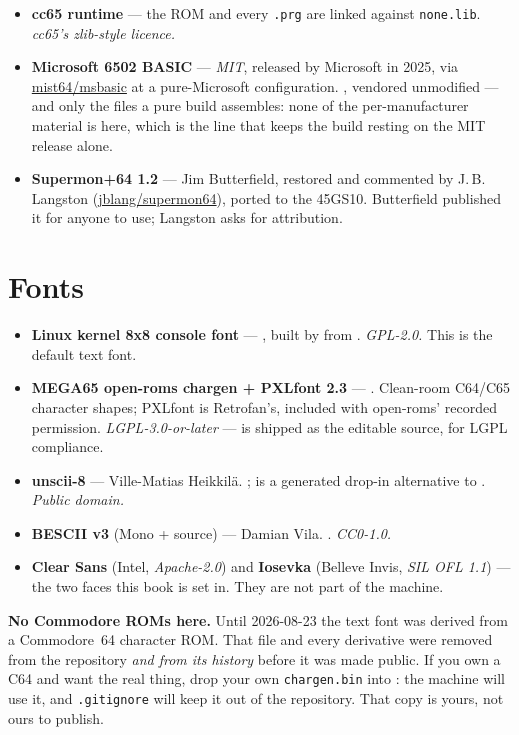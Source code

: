 \begin{itemize}[leftmargin=1.4em]
  licence.
\item \textbf{cc65 runtime} --- the ROM and every \verb|.prg| are
  linked against \verb|none.lib|. \emph{cc65's zlib-style licence.}
\item \textbf{Microsoft 6502 BASIC} --- \emph{MIT}, released by
  Microsoft in 2025, via \href{https://github.com/mist64/msbasic}{mist64/msbasic}
  at a pure-Microsoft configuration. , vendored
  unmodified --- and only the files a pure build assembles: none of the
  per-manufacturer material is here, which is the line that keeps the
  build resting on the MIT release alone.
\item \textbf{Supermon+64 1.2} --- Jim Butterfield, restored and
  commented by J.\,B. Langston
  (\href{https://github.com/jblang/supermon64}{jblang/supermon64}),
  ported to the 45GS10. Butterfield published it for anyone to use;
  Langston asks for attribution.
\end{itemize}

\section{Fonts}
\begin{itemize}[leftmargin=1.4em]
\item \textbf{Linux kernel 8x8 console font} --- ,
  built by  from .
  \emph{GPL-2.0.} This is the default text font.
\item \textbf{MEGA65 open-roms chargen + PXLfont 2.3} ---
  . Clean-room C64/C65 character shapes;
  PXLfont is Retrofan's, included with open-roms' recorded permission.
  \emph{LGPL-3.0-or-later} ---  is shipped as the
  editable source, for LGPL compliance.
\item \textbf{unscii-8} --- Ville-Matias Heikkilä.
  ;  is a generated
  drop-in alternative to . \emph{Public domain.}
\item \textbf{BESCII v3} (Mono + source) --- Damian Vila.
  . \emph{CC0-1.0.}
\item \textbf{Clear Sans} (Intel, \emph{Apache-2.0}) and
  \textbf{Iosevka} (Belleve Invis, \emph{SIL OFL 1.1}) --- the two
  faces this book is set in. They are not part of the machine.
\end{itemize}

\begin{aside}
\textbf{No Commodore ROMs here.} Until 2026-08-23 the text font was
derived from a Commodore~64 character ROM. That file and every
derivative were removed from the repository \emph{and from its
history} before it was made public. If you own a C64 and want the real
thing, drop your own \verb|chargen.bin| into : the
machine will use it, and \verb|.gitignore| will keep it out of the
repository. That copy is yours, not ours to publish.
\end{aside}

